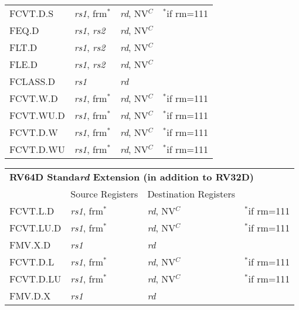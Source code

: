 \begin{tabular}{p{25mm}|p{3cm}|p{6cm}|p{10cm}}
   \cline{2-3}
   FCVT.D.S & {\em rs1}, frm$^*$ & {\em rd}, NV$^C$ & $^*$if rm=111 \\
   \cline{2-3}
   FEQ.D & {\em rs1}, {\em rs2} & {\em rd}, NV$^C$ &  \\
   \cline{2-3}
   FLT.D & {\em rs1}, {\em rs2} & {\em rd}, NV$^C$ &  \\
   \cline{2-3}
   FLE.D & {\em rs1}, {\em rs2} & {\em rd}, NV$^C$ &  \\
   \cline{2-3}
   FCLASS.D & {\em rs1} & {\em rd} &  \\
   \cline{2-3}
   FCVT.W.D & {\em rs1}, frm$^*$ & {\em rd}, NV$^C$ & $^*$if rm=111 \\
   \cline{2-3}
   FCVT.WU.D & {\em rs1}, frm$^*$ & {\em rd}, NV$^C$ & $^*$if rm=111 \\
   \cline{2-3}
   FCVT.D.W & {\em rs1}, frm$^*$ & {\em rd}, NV$^C$ & $^*$if rm=111 \\
   \cline{2-3}
   FCVT.D.WU & {\em rs1}, frm$^*$ & {\em rd}, NV$^C$ & $^*$if rm=111 \\
   \cline{2-3}
\end{tabular}

\begin{tabular}{p{25mm}|p{3cm}|p{6cm}|p{10cm}}
  \multicolumn{4}{l}{\bf RV64D Standa{\em rd} Extension (in addition to RV32D)} \\
  \cline{2-3}
   & Source Registers & Destination Registers \\
  \cline{2-3}
   FCVT.L.D & {\em rs1}, frm$^*$ & {\em rd}, NV$^C$ & $^*$if rm=111 \\
   \cline{2-3}
   FCVT.LU.D & {\em rs1}, frm$^*$ & {\em rd}, NV$^C$ & $^*$if rm=111 \\
   \cline{2-3}
   FMV.X.D & {\em rs1} & {\em rd} &  \\
   \cline{2-3}
   FCVT.D.L & {\em rs1}, frm$^*$ & {\em rd}, NV$^C$ & $^*$if rm=111 \\
   \cline{2-3}
   FCVT.D.LU & {\em rs1}, frm$^*$ & {\em rd}, NV$^C$ & $^*$if rm=111 \\
   \cline{2-3}
   FMV.D.X & {\em rs1} & {\em rd} &  \\
   \cline{2-3}
\end{tabular}

